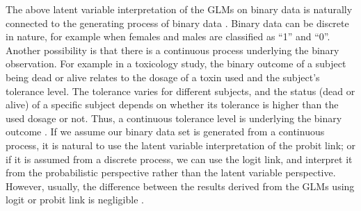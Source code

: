 The above latent variable interpretation of the GLMs on binary data is naturally connected to the generating process of binary data \cite{young1980quantifying}. Binary data can be discrete in nature, for example when females and males are classified as ``1'' and ``0''. Another possibility is that there is a continuous process underlying the binary observation. For example in a toxicology study, the binary outcome of a subject being dead or alive relates to the dosage of a toxin used and the subject's tolerance level. The tolerance varies for different subjects, and the status (dead or alive) of a specific subject depends on whether its tolerance is higher than the used dosage or not. Thus, a continuous tolerance level is underlying the binary outcome \cite{agresti2013categorical}. If we assume our binary data set is generated from a continuous process, it is natural to use the latent variable interpretation of the probit link; or if it is assumed from a discrete process, we can use the logit link, and interpret it from the probabilistic perspective rather than the latent variable perspective. However, usually, the difference between the results derived from the GLMs using logit or probit link is negligible \cite{agresti2013categorical}.

